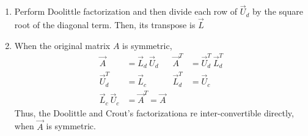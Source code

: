\begin{enumerate}
\begin{enumerate}
\begin{align}
\begin{bNiceMatrix}[margin]
                            1  & 0 & 0 \\
                            -4 & 3 & 0 \\
                            2  & 4 & 2
                        \end{bNiceMatrix} \begin{bNiceMatrix}[margin]
                                              1 & -4 & 2 \\
                                              0 & 3  & 4 \\
                                              0 & 0  & 2
                                          \end{bNiceMatrix}
                    \end{align}

              \item Perform Doolittle factorization and then divide each row
                    of $ \vec{U}_d $ by the square root of the diagonal term. Then,
                    its transpose is $ \vec{L} $

              \item When the original matrix $ A $ is symmetric,
                    \begin{align}
                        \vec{A}              & = \vec{L}_d\ \vec{U}_d     &
                        \vec{A}^T            & = \vec{U}_d^T\ \vec{L}_d^T   \\
                        \vec{U}_d^T          & = \vec{L}_c                &
                        \vec{L}_d^T          & = \vec{U}_c                  \\
                        \vec{L}_c\ \vec{U}_c & = \vec{A}^T = \vec{A}
                    \end{align}
                    Thus, the Doolittle and Crout's factorizationa re inter-convertible
                    directly, when $ \vec{A} $ is symmetric.
          \end{enumerate}


\end{enumerate}
